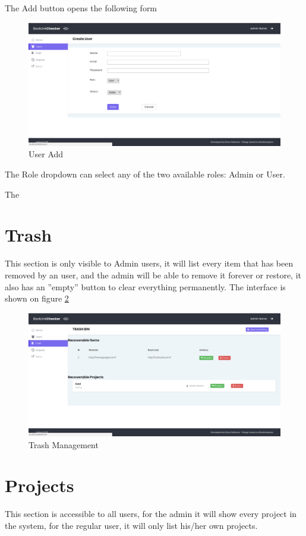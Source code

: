 The Add button opens the following form
\begin{figure}[H]
	\caption{User Add}
	\label{img:usradd}
	\includegraphics[width=\textwidth]{images/users_add}
\end{figure}
The Role dropdown can select any of the two available roles: Admin or User.

The 

\section{Trash}
This section is only visible to Admin users, it will list every item that has been removed by an user, and the admin will be able to remove it forever or restore, it also has an ''empty'' button to clear everything permanently. 
The interface is shown on figure \ref{img:trash}

\begin{figure}[H]
	\caption{Trash Management}
	\label{img:trash}
	\includegraphics[width=\textwidth]{images/trash_manage.png}
\end{figure}

\section{Projects}
This section is accessible to all users, for the admin it will show every project in the system, for the regular user, it will only list his/her own projects.


